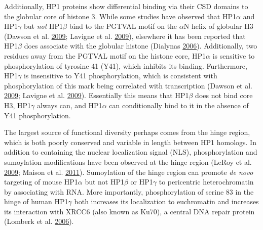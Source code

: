 \documentclass[onehalf,12pt]{beavtex}
\begin{document}
  Additionally, HP1 proteins show differential binding via their CSD
  domains to the globular core of histone 3. While some studies have
  observed that HP1\(\alpha\) and HP1\(\gamma\) but \emph{not}
  HP1\(\beta\) bind to the PGTVAL motif on the \(\alpha\)N helix of
  globular H3 (Dawson et al.
  \protect\hyperlink{ref-DawsonJAK2phosphorylateshistone2009}{2009};
  Lavigne et al.
  \protect\hyperlink{ref-LavigneInteractionHP1Brg12009}{2009}), elsewhere
  it has been reported that HP1\(\beta\) does associate with the globular
  histone (Dialynas
  \protect\hyperlink{ref-DialynasMethylationindependentBindingHistone2006}{2006}).
  Additionally, two residues away from the PGTVAL motif on the histone
  core, HP1\(\alpha\) is sensitive to phosphorylation of tyrosine 41
  (Y41), which inhibits its binding. Furthermore, HP1\(\gamma\) is
  insensitive to Y41 phosphorylation, which is consistent with
  phosphorylation of this mark being correlated with transcription (Dawson
  et al.
  \protect\hyperlink{ref-DawsonJAK2phosphorylateshistone2009}{2009};
  Lavigne et al.
  \protect\hyperlink{ref-LavigneInteractionHP1Brg12009}{2009}).
  Essentially this means that HP1\(\beta\) does not bind core H3,
  HP1\(\gamma\) always can, and HP1\(\alpha\) can conditionally bind to it
  in the absence of Y41 phosphorylation.
  
  The largest source of functional diversity perhaps comes from the hinge
  region, which is both poorly conserved and variable in length between
  HP1 homologs. In addition to containing the nuclear localization signal
  (NLS), phosphorylation and sumoylation modifications have been observed
  at the hinge region (LeRoy et al.
  \protect\hyperlink{ref-LeRoyHeterochromatinProteinExtensively2009}{2009};
  Maison et al.
  \protect\hyperlink{ref-MaisonSUMOylationpromotesnovo2011}{2011}).
  Sumoylation of the hinge region can promote \emph{de novo} targeting of
  mouse HP1\(\alpha\) but not HP1\(\beta\) or HP1\(\gamma\) to pericentric
  heterochromatin by associating with RNA. More importantly,
  phosphorylation of serine 83 in the hinge of human HP1\(\gamma\) both
  increases its localization to euchromatin and increases its interaction
  with XRCC6 (also known as Ku70), a central DNA repair protein (Lomberk
  et al.
  \protect\hyperlink{ref-LomberkEvidenceexistenceHP1mediated2006}{2006}).
  
\end{document}
